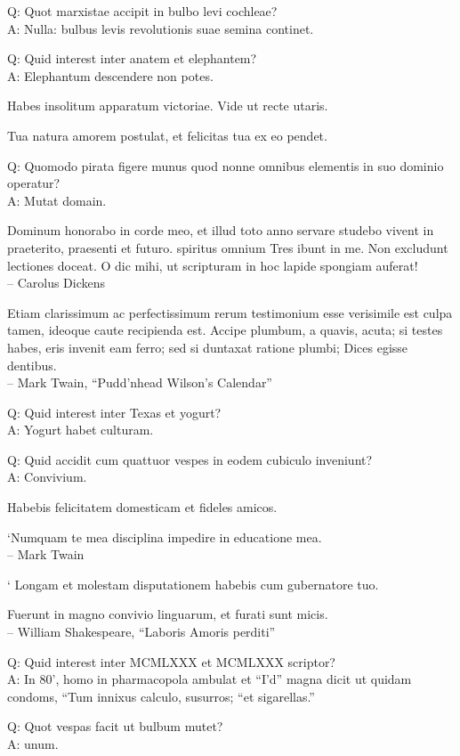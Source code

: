 \documentclass[titlepage,12pt]{memoir}
\begin{document}
Q: Quot marxistae accipit in bulbo levi cochleae?\\
A: Nulla: bulbus levis revolutionis suae semina continet.

Q: Quid interest inter anatem et elephantem?\\
A: Elephantum descendere non potes.

Habes insolitum apparatum victoriae. Vide ut recte utaris.

Tua natura amorem postulat, et felicitas tua ex eo pendet.

Q: Quomodo pirata figere munus quod
nonne omnibus elementis in suo dominio operatur?\\
A: Mutat domain.

Dominum honorabo in corde meo, et illud toto anno servare studebo
vivent in praeterito, praesenti et futuro. spiritus omnium
Tres ibunt in me. Non excludunt lectiones
doceat. O dic mihi, ut scripturam in hoc lapide spongiam auferat!
\\-- Carolus Dickens

Etiam clarissimum ac perfectissimum rerum testimonium esse verisimile est
culpa tamen, ideoque caute recipienda est. Accipe
plumbum, a quavis, acuta; si testes habes, eris
invenit eam ferro; sed si duntaxat ratione plumbi;
Dices egisse dentibus.
\\-- Mark Twain, “Pudd’nhead Wilson’s Calendar”

Q: Quid interest inter Texas et yogurt?\\
A: Yogurt habet culturam.

Q: Quid accidit cum quattuor vespes in eodem cubiculo inveniunt?\\
A: Convivium.

 Habebis felicitatem domesticam et fideles amicos.

‘Numquam te mea disciplina impedire in educatione mea.
\\-- Mark Twain

‘ Longam et molestam disputationem habebis cum gubernatore tuo.

Fuerunt in magno convivio linguarum, et furati sunt micis.
\\-- William Shakespeare, “Laboris Amoris perditi”

Q: Quid interest inter MCMLXXX et MCMLXXX scriptor?\\
A: In 80’, homo in pharmacopola ambulat et “I’d” magna dicit
ut quidam condoms, “Tum innixus calculo, susurros;
“et sigarellas.”

Q: Quot vespas facit ut bulbum mutet?\\
A: unum.
\end{document}
